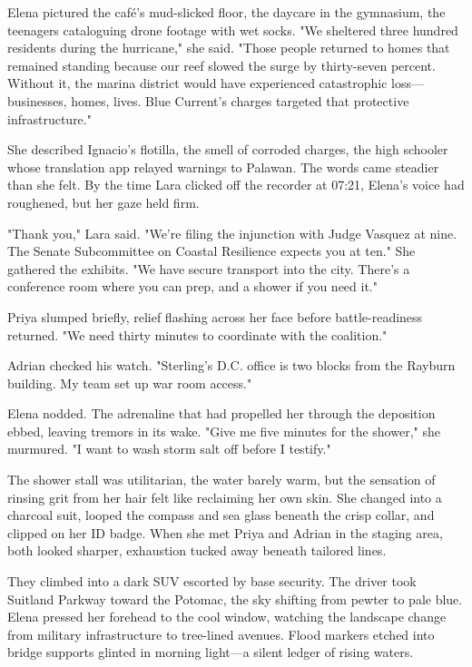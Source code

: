 Elena pictured the café's mud-slicked floor, the daycare in the gymnasium, the teenagers cataloguing drone footage with wet socks. "We sheltered three hundred residents during the hurricane," she said. "Those people returned to homes that remained standing because our reef slowed the surge by thirty-seven percent. Without it, the marina district would have experienced catastrophic loss—businesses, homes, lives. Blue Current's charges targeted that protective infrastructure."

She described Ignacio's flotilla, the smell of corroded charges, the high schooler whose translation app relayed warnings to Palawan. The words came steadier than she felt. By the time Lara clicked off the recorder at 07:21, Elena's voice had roughened, but her gaze held firm.

"Thank you," Lara said. "We're filing the injunction with Judge Vasquez at nine. The Senate Subcommittee on Coastal Resilience expects you at ten." She gathered the exhibits. "We have secure transport into the city. There's a conference room where you can prep, and a shower if you need it."

Priya slumped briefly, relief flashing across her face before battle-readiness returned. "We need thirty minutes to coordinate with the coalition."

Adrian checked his watch. "Sterling's D.C. office is two blocks from the Rayburn building. My team set up war room access."

Elena nodded. The adrenaline that had propelled her through the deposition ebbed, leaving tremors in its wake. "Give me five minutes for the shower," she murmured. "I want to wash storm salt off before I testify."

The shower stall was utilitarian, the water barely warm, but the sensation of rinsing grit from her hair felt like reclaiming her own skin. She changed into a charcoal suit, looped the compass and sea glass beneath the crisp collar, and clipped on her ID badge. When she met Priya and Adrian in the staging area, both looked sharper, exhaustion tucked away beneath tailored lines.

They climbed into a dark SUV escorted by base security. The driver took Suitland Parkway toward the Potomac, the sky shifting from pewter to pale blue. Elena pressed her forehead to the cool window, watching the landscape change from military infrastructure to tree-lined avenues. Flood markers etched into bridge supports glinted in morning light—a silent ledger of rising waters.

